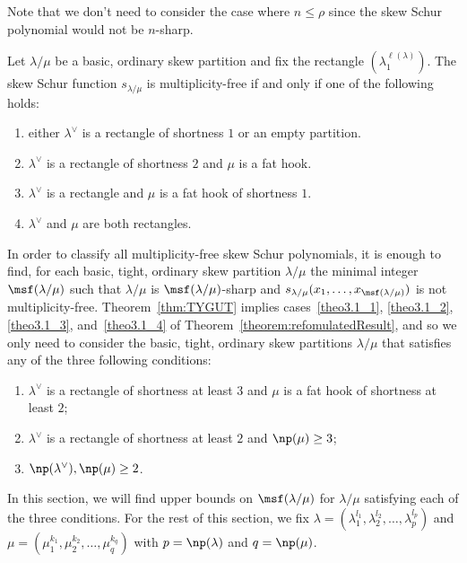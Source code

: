 Note that we don't need to consider the case where $n\leq \rho$ since the skew Schur polynomial would not be $n$-sharp.



\begin{theorem}[\cite{G10, TY10}]
\label{thm:TYGUT}
 Let $\lambda/\mu$ be a basic, ordinary skew partition and fix the rectangle $(\lambda_1^{\ell(\lambda)})$. The skew Schur function $s_{\lambda/\mu}$ is multiplicity-free if and only if one of the following holds:
 \begin{enumerate}[label=(\Roman{*})]
 \item\label{theo3.2_1} either $\lambda^\vee$ is a rectangle of shortness $1$ or an empty partition.
 \item\label{theo3.2_2} $\lambda^\vee$ is a rectangle of shortness $2$ and $\mu$ is a fat hook.
 \item\label{theo3.2_3} $\lambda^\vee$ is a rectangle and $\mu$ is a fat hook of shortness $1$.
	 \item\label{theo3.2_4} $\lambda^\vee$ and $\mu$ are both rectangles.
 \end{enumerate}
\end{theorem}

In order to classify all multiplicity-free skew Schur polynomials, it is enough to find, for each basic, tight, ordinary skew partition $\lambda/\mu$ the minimal integer $\msf(\lambda/\mu)$ such that $\lambda/\mu$ is $\msf (\lambda/\mu)$-sharp and $s_{\lambda/\mu}(x_1,\ldots,x_{\msf (\lambda/\mu)})$ is not multiplicity-free. Theorem~\ref{thm:TYGUT} implies cases~\ref{theo3.1_1}, \ref{theo3.1_2}, \ref{theo3.1_3}, and~\ref{theo3.1_4} of Theorem~\ref{theorem:refomulatedResult}, and so we only need to consider the basic, tight, ordinary skew partitions $\lambda/\mu$ that satisfies any of the three following conditions:
\begin{enumerate}[label=(\Roman{*})]
 \item\label{theo3.2_cond1} $\lambda^\vee$ is a rectangle of shortness at least $3$ and $\mu$ is a fat hook of shortness at least $2$;
 \item\label{theo3.2_cond2} $\lambda^\vee$ is a rectangle of shortness at least $2$ and $\np (\mu) \geq 3$;
 \item\label{theo3.2_cond3} $\np (\lambda^\vee), \np (\mu) \geq 2$.
\end{enumerate}
 In this section, we will find upper bounds on $\msf (\lambda/\mu)$ for $\lambda/\mu$ satisfying each of the three conditions. For the rest of this section, we fix $\lambda = (\lambda_1^{l_1},\lambda_2^{l_2},\ldots,\lambda_p^{l_p})$ and $\mu = (\mu_1^{k_1},\mu_2^{k_2},\ldots,\mu_q^{k_q})$ with $p = \np (\lambda)$ and $q = \np (\mu)$.

